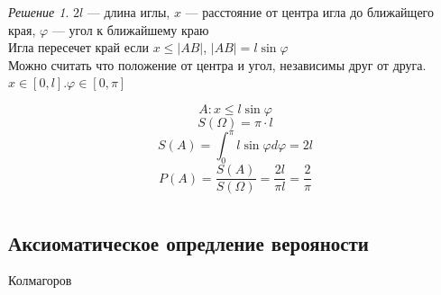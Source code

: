 \documentclass[oneside]{book}
\theoremstyle{plain}
\theoremstyle{remark}
\newtheorem*{solution}{Решение}
\theoremstyle{definition}
\begin{document}
\begin{solution}
\(2l\) --- длина иглы, \(x\) --- расстояние от центра игла до ближайщего края, \(\varphi\) --- угол к ближайшему краю \\
Игла пересечет край если \(x \le |AB|\), \(|AB| = l\sin\varphi\) \\
Можно считать что положение от центра и угол, независимы друг от друга. \(x \in [0, l]. \varphi \in [0, \pi]\)
\begin{center}
\end{center}

\[ A: x \le l\sin\varphi \]
\[ S(\Omega) = \pi\cdot l \]
\[ S(A) = \int^\pi_0 l\sin\varphi d\varphi = 2l \]
\[ P(A) = \frac{S(A)}{S(\Omega)} = \frac{2l}{\pi l} = \frac{2}{\pi} \]
\end{solution}
\chapter{}
\label{sec:org26d7d75}
\section{Аксиоматическое опредление верояности}
\label{sec:orgb09269e}
Колмагоров \\
\end{document}
